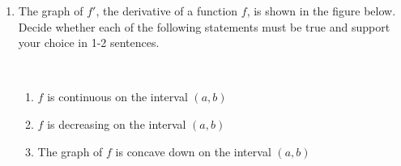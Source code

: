 \documentclass{article}
\begin{document}
\begin{enumerate}
\begin{enumerate}
\begin{center}
        

\end{center}
        \item \begin{problem}[\vfill]Find an equation for $f^{-1}(x)$. Describe its graph and make sure to include asymptotes and intercepts. 
        \end{problem}
        \item \begin{problem}[\vfill]Let $g(x)=2\log_2(x-4)+5$. Compute all intersection points of $f$ and $g$. Give both the $x$ and $y$ coordinates. \\
        
        \end{problem}
        \newpage
       

        
\end{enumerate}
\newpage

\item The graph of  $f'$, the derivative of a function $f$,   is shown in the figure below. Decide whether each of the following statements must be true and support your choice in 1-2 sentences. 

\begin{center}
 \\
  \end{center}      

\begin{enumerate}
		\item 
        \begin{problem}[\vfill]$f$  is continuous on the  interval  $(a,b)$
        \end{problem}
		\item 
        \begin{problem}[\vfill]$f$ is  decreasing on the  interval  $(a,b)$
        \end{problem}
		\item  
        \begin{problem}[\vfill]The graph of $f$  is concave down on the  interval  $(a,b)$
        \end{problem}
\end{enumerate}
\newpage




\end{enumerate}
\end{document}
